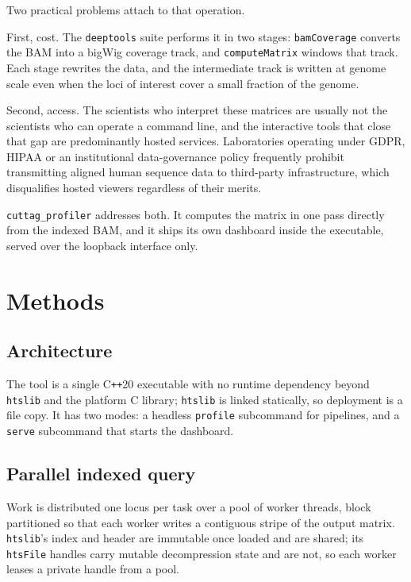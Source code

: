 \documentclass[11pt,a4paper]{article}
\begin{document}
Two practical problems attach to that operation.

First, cost. The \texttt{deeptools} suite \citep{ramirez2016} performs it in two
stages: \texttt{bamCoverage} converts the BAM into a bigWig coverage track, and
\texttt{computeMatrix} windows that track. Each stage rewrites the data, and the
intermediate track is written at genome scale even when the loci of interest
cover a small fraction of the genome.

Second, access. The scientists who interpret these matrices are usually not the
scientists who can operate a command line, and the interactive tools that close
that gap are predominantly hosted services. Laboratories operating under
GDPR, HIPAA or an institutional data-governance policy frequently prohibit
transmitting aligned human sequence data to third-party infrastructure, which
disqualifies hosted viewers regardless of their merits.

\texttt{cuttag\_profiler} addresses both. It computes the matrix in one pass
directly from the indexed BAM, and it ships its own dashboard inside the
executable, served over the loopback interface only.

\section{Methods}

\subsection{Architecture}

The tool is a single C\texttt{++}20 executable with no runtime dependency
beyond \texttt{htslib} and the platform C library; \texttt{htslib} is linked
statically, so deployment is a file copy. It has two modes: a headless
\texttt{profile} subcommand for pipelines, and a \texttt{serve} subcommand that
starts the dashboard.

\subsection{Parallel indexed query}

Work is distributed one locus per task over a pool of worker threads, block
partitioned so that each worker writes a contiguous stripe of the output matrix.
\texttt{htslib}'s index and header are immutable once loaded and are shared;
its \texttt{htsFile} handles carry mutable decompression state and are not, so
each worker leases a private handle from a pool.
\end{document}
